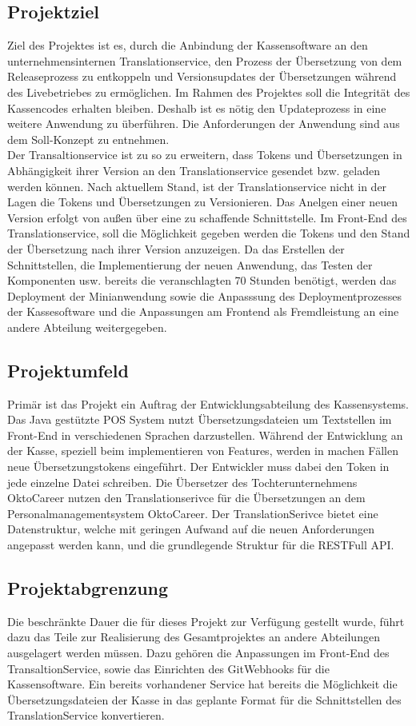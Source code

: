 \documentclass[oneside]{article}
\begin{document}
  \subsection{Projektziel}
    Ziel des Projektes ist es, durch die Anbindung der Kassensoftware an den unternehmensinternen Translationservice,
    den Prozess der Übersetzung von dem Releaseprozess zu entkoppeln und Versionsupdates der Übersetzungen während des Livebetriebes zu ermöglichen.
    Im Rahmen des Projektes soll die Integrität des Kassencodes erhalten bleiben. Deshalb ist es nötig den Updateprozess in eine weitere Anwendung zu überführen. 
    Die Anforderungen der Anwendung sind aus dem Soll-Konzept zu entnehmen.\\
    Der Transaltionservice ist zu so zu erweitern, dass Tokens und Übersetzungen in Abhängigkeit ihrer Version an den Translationservice gesendet bzw. geladen werden können.
    Nach aktuellem Stand, ist der Translationservice nicht in der Lagen die Tokens und Übersetzungen zu Versionieren. Das Anelgen einer neuen Version erfolgt von außen über eine zu schaffende Schnittstelle.
    Im Front-End des Translationservice, soll die Möglichkeit gegeben werden die Tokens und den Stand der Übersetzung nach ihrer Version anzuzeigen.
    Da das Erstellen der Schnittstellen, die Implementierung der neuen Anwendung, das Testen der Komponenten usw. bereits die veranschlagten 70 Stunden benötigt,
    werden das Deployment der Minianwendung sowie die Anpasssung des Deploymentprozesses der Kassesoftware und die Anpassungen am Frontend als Fremdleistung an eine andere Abteilung weitergegeben. 
  \subsection{Projektumfeld}
    Primär ist das Projekt ein Auftrag der Entwicklungsabteilung des Kassensystems. Das Java gestützte POS System nutzt Übersetzungsdateien um Textstellen im Front-End in verschiedenen Sprachen darzustellen.
    Während der Entwicklung an der Kasse, speziell beim implementieren von Features, werden in machen Fällen neue Übersetzungstokens eingeführt. Der Entwickler muss dabei den Token in jede einzelne Datei schreiben. 
    Die Übersetzer des Tochterunternehmens OktoCareer nutzen den Translationserivce für die Übersetzungen an dem Personalmanagementsystem OktoCareer. 
    Der TranslationSerivce bietet eine Datenstruktur, welche mit geringen Aufwand auf die neuen Anforderungen angepasst werden kann, und die grundlegende Struktur für die RESTFull API. 
  \subsection{Projektabgrenzung}
    Die beschränkte Dauer die für dieses Projekt zur Verfügung gestellt wurde, führt dazu das Teile zur Realisierung des Gesamtprojektes an andere Abteilungen ausgelagert werden müssen.
    Dazu gehören die Anpassungen im Front-End des TransaltionService, sowie das Einrichten des GitWebhooks für die Kassensoftware. Ein bereits vorhandener Service hat bereits die Möglichkeit die Übersetzungsdateien 
    der Kasse in das geplante Format für die Schnittstellen des TranslationService konvertieren. 
\end{document}
